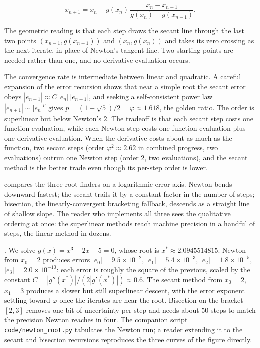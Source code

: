 \[
x_{n+1} = x_{n} - g(x_{n}) \,
\frac{x_{n} - x_{n-1}}{g(x_{n}) - g(x_{n-1})}.
\]

The geometric reading is that each step draws the secant line
through the last two points $(x_{n-1}, g(x_{n-1}))$ and
$(x_{n}, g(x_{n}))$ and takes its zero crossing as the next
iterate, in place of Newton's tangent line. Two starting points
are needed rather than one, and no derivative evaluation occurs.

The convergence rate is intermediate between linear and quadratic.
A careful expansion of the error recursion shows that near a simple
root the secant error obeys $|e_{n+1}| \approx C \, |e_{n}| \,
|e_{n-1}|$, and seeking a self-consistent power law $|e_{n+1}| \sim
|e_{n}|^{p}$ gives $p = (1 + \sqrt{5})/2 = \varphi \approx 1.618$,
the golden ratio. The order is superlinear but below Newton's $2$.
The tradeoff is that each secant step costs one function evaluation,
while each Newton step costs one function evaluation plus one
derivative evaluation. When the derivative costs about as much as
the function, two secant steps (order $\varphi^{2} \approx 2.62$ in
combined progress, two evaluations) outrun one Newton step (order
$2$, two evaluations), and the secant method is the better trade
even though its per-step order is lower.



 compares the three
root-finders on a logarithmic error axis. Newton bends downward
fastest; the secant trails it by a constant factor in the number of
steps; bisection, the linearly-convergent bracketing fallback,
descends as a straight line of shallow slope. The reader who
implements all three sees the qualitative ordering at once: the
superlinear methods reach machine precision in a handful of steps,
the linear method in dozens.

. We solve $g(x) = x^{3} -
2x - 5 = 0$, whose root is $x^{*} \approx 2.0945514815$. Newton
from $x_{0} = 2$ produces errors $|e_{0}| = 9.5 \times 10^{-2}$,
$|e_{1}| = 5.4 \times 10^{-3}$, $|e_{2}| = 1.8 \times 10^{-5}$,
$|e_{3}| = 2.0 \times 10^{-10}$: each error is roughly the square
of the previous, scaled by the constant $C = |g''(x^{*})|/(2
|g'(x^{*})|) \approx 0.6$. The secant method from $x_{0} = 2$,
$x_{1} = 3$ produces a slower but still superlinear descent, with
the error exponent settling toward $\varphi$ once the iterates are
near the root. Bisection on the bracket $[2, 3]$ removes one bit of
uncertainty per step and needs about $50$ steps to match the
precision Newton reaches in four. The companion script
\texttt{code/newton\_root.py} tabulates the Newton run; a reader
extending it to the secant and bisection recursions reproduces the
three curves of the figure directly.

